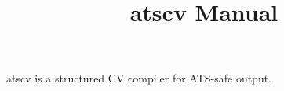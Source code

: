 \documentclass{article}
\title{atscv Manual}
\begin{document}
\maketitle
atscv is a structured CV compiler for ATS-safe output.
\end{document}
